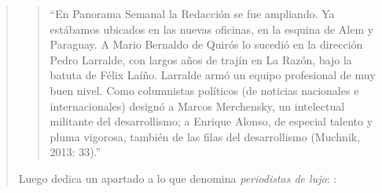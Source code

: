 \begin{quote}
\begin{quote}
	\enquote{En Panorama Semanal la Redacción se fue ampliando. Ya estábamos ubicados en las nuevas oficinas, en la esquina de Alem y Paraguay. A Mario Bernaldo de Quirós lo sucedió en la dirección Pedro Larralde, con largos años de trajín en La Razón, bajo la batuta de Félix Laíño. Larralde armó un equipo profesional de muy buen nivel. Como columnistas políticos (de noticias nacionales e internacionales) designó a Marcos Merchensky, un intelectual militante del desarrollismo; a Enrique Alonso, de especial talento y pluma vigorosa, también de las filas del desarrollismo (Muchnik, 2013: 33).}
\end{quote}


Luego dedica un apartado a lo que denomina \emph{periodistas de lujo}: :

\begin{quote}

\end{quote}
\end{quote}
